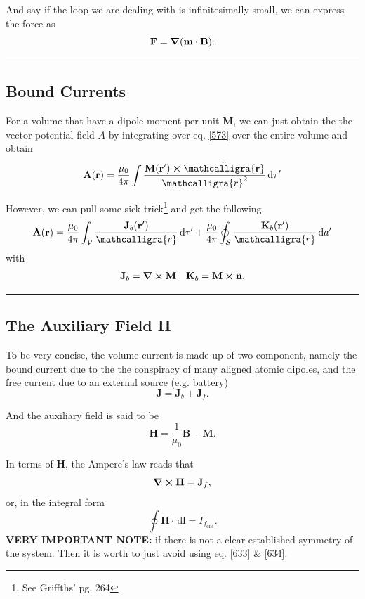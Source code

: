 \documentclass[12pt,english]{article}
\newcommand{\dmr}[1]{\, \mathrm{d}#1} %
\numberwithin{equation}{subsection}
\newcommand{\curly}[1]{\ensuremath{\mathcalligra{#1}}}
\let\oldhat\hat
\renewcommand{\vec}[1]{\mathbf{#1}}
\renewcommand{\hat}[1]{\oldhat{\mathbf{#1}}}
\begin{document}
And say if the loop we are dealing with is infinitesimally small, we can express the force as
\begin{equation}
    \vec{F} = \grad(\vec{m}\cdot\vec{B}).
\end{equation}

\par\noindent\rule{\textwidth}{0.4pt}
\subsection{Bound Currents}
For a volume that have a dipole moment per unit $\vec{M}$, we can just obtain the the vector potential field $A$ by integrating over eq. \ref{573} over the entire volume and obtain
\begin{equation}
    \vec{A}(\vec{r}) = \frac{\mu_0}{4\pi}\int\frac{\vec{M}(\vec{r}')\cross \hat{\curly{r}}}{\curly{r}^2}\dmr{\tau'}
\end{equation}

However, we can pull some sick trick\footnote{See Griffths' pg. 264} and get the following
\begin{equation}
    \vec{A}(\vec{r}) = \frac{\mu_0}{4\pi}\int_{\mathcal{V}}\frac{\vec{J}_b(\vec{r}')}{\curly{r}}\dmr{\tau'}+\frac{\mu_0}{4\pi}\oint_{\mathcal{S}}\frac{\vec{K}_b(\vec{r}')}{\curly{r}}\dmr{a'}
\end{equation} 
with 
\begin{align*}
    \vec{J}_b = \curl\vec{M} && \vec{K}_b = \vec{M}\cross\hat{n}.
\end{align*}

\par\noindent\rule{\textwidth}{0.4pt}
\subsection{The Auxiliary Field H}
To be very concise, the volume current is made up of two component, namely the bound current due to the the conspiracy of many aligned atomic dipoles, and the free current due to an external source (e.g. battery)
\begin{equation}
    \vec{J} = \vec{J}_b + \vec{J}_f.
\end{equation}

And the auxiliary field is said to be 
\begin{equation}
    \vec{H} = \frac{1}{\mu_0}\vec{B} - \vec{M}.
\end{equation}

In terms of $\vec{H}$, the Ampere's law reads that
\begin{equation}
    \curl \vec{H} = \vec{J}_f, \label{633}
\end{equation}
or, in the integral form
\begin{equation}
    \oint \vec{H}\cdot\dmr{\vec{l}} = I_{f_{\text{enc}}}. \label{634}
\end{equation}
\textbf{VERY IMPORTANT NOTE:} if there is not a clear established symmetry of the system. Then it is worth to just avoid using eq. \ref{633} \& \ref{634}.
\end{document}
